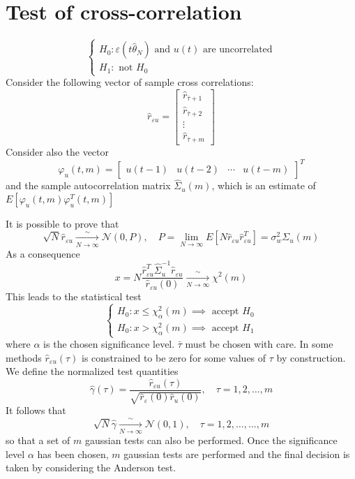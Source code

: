 \documentclass{book}
\theoremstyle{definition}
\theoremstyle{remark}
\theoremstyle{remark}
\begin{document}
\section{Test of cross-correlation}
\[
    \begin{cases}
        H_0: \varepsilon(t\hat{\theta}_N) \text{ and } u(t) \text{ are uncorrelated}\\
        H_1: \text{ not } H_0
    \end{cases}
\]
Consider the following vector of sample cross correlations:
\[
    \hat{r}_{\varepsilon u} = \begin{bmatrix}
        \hat{r}_{\bar{\tau}+1} \\
        \hat{r}_{\bar{\tau}+2} \\
        \vdots\\
        \hat{r}_{\bar{\tau}+m} 
    \end{bmatrix}
\]
Consider also the vector
\[
    \varphi_u(t,m) = \begin{bmatrix}
        u(t-1) & u(t-2) & \cdots & u(t-m)
    \end{bmatrix}^T
\]
and the sample autocorrelation matrix $\hat{\Sigma}_u(m)$, which is an estimate of $E[\varphi_u(t,m)\varphi_u^T(t,m)]$

It is possible to prove that 
\[
    \sqrt{N}\hat{r}_{\varepsilon u}\xrightarrow[N\to\infty] \sim \mathcal{N}(0,P), \quad P= \lim_{N\to\infty}E[N\hat{r}_{\varepsilon u}\hat{r}_{\varepsilon u}^T]=\sigma_w^2\Sigma_u(m)
\]
As a consequence
\[
    x=N\displaystyle\frac{\hat{r}_{\varepsilon u}^T\hat{\Sigma}_u^{-1}\hat{r}_{\varepsilon u}}{\hat{r}_{\varepsilon u}(0)}\xrightarrow[N\to\infty]\sim\chi^2(m)
\]
This leads to the statistical test
\[
    \begin{cases}
        H_0 : x \leq \chi^2_\alpha(m) \implies \text{ accept } H_0\\
        H_0 : x >\chi^2_\alpha(m) \implies \text{ accept } H_1
    \end{cases}
\]
where $\alpha$ is the chosen significance level. $\bar{\tau}$ must be chosen with care. In some methods  $\hat{r}_{\varepsilon u}(\tau)$ is constrained to be zero for some values of $\tau$ by construction.
We define the normalized test quantities 
\[
    \hat{\gamma}(\tau) = \displaystyle\frac{\hat{r}_{\varepsilon u}(\tau)}{\sqrt{\hat{r}_\varepsilon(0)\hat{r}_u(0)}}, \quad \tau=1,2,\dots,m 
\]
It follows that 
\[
    \sqrt{N}\hat{\gamma}\xrightarrow[N\to\infty]\sim \mathcal{N}(0,1), \quad \tau = 1,2,\dots,\dots,m  
\]
so that a set of $m$ gaussian tests can also be performed. Once the significance level $\alpha$ has been chosen, $m$ gaussian tests are performed and the final decision is taken by considering the Anderson test.
\end{document}

